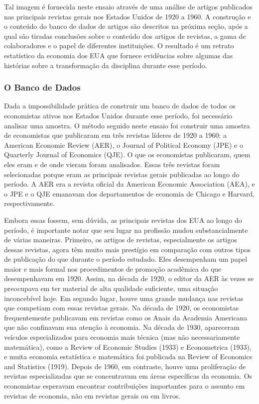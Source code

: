 \documentclass[12pt]{article}
\begin{document}
Tal imagem é fornecida neste ensaio através de uma análise de artigos publicados nas principais revistas gerais nos Estados Unidos de 1920 a 1960. A construção e o conteúdo do banco de dados de artigos são descritos na próxima seção, após a qual são tiradas conclusões sobre o conteúdo dos artigos de revistas, a gama de colaboradores e o papel de diferentes instituições. O resultado é um retrato estatístico da economia dos EUA que fornece evidências sobre algumas das histórias sobre a transformação da disciplina durante esse período.

\subsubsection{\textbf{O Banco de Dados}}
Dada a impossibilidade prática de construir um banco de dados de todos os economistas ativos nos Estados Unidos durante esse período, foi necessário analisar uma amostra. O método seguido neste ensaio foi construir uma amostra de economistas que publicaram em três revistas líderes de 1920 a 1960: a American Economic Review (AER), o Journal of Political Economy (JPE) e o Quarterly Journal of Economics (QJE). O que os economistas publicaram, quem eles eram e de onde vieram foram analisados. Essas três revistas foram selecionadas porque eram as principais revistas gerais publicadas ao longo do período. A AER era a revista oficial da American Economic Association (AEA), e o JPE e o QJE emanavam dos departamentos de economia de Chicago e Harvard, respectivamente.

Embora essas fossem, sem dúvida, as principais revistas dos EUA ao longo do período, é importante notar que seu lugar na profissão mudou substancialmente de várias maneiras. Primeiro, os artigos de revistas, especialmente os artigos dessas revistas, agora têm muito mais prestígio em comparação com outros tipos de publicação do que durante o período estudado. Eles desempenham um papel maior e mais formal nos procedimentos de promoção acadêmica do que desempenhavam em 1920. Assim, na década de 1920, o editor da AER às vezes se preocupava em ter material de alta qualidade suficiente, uma situação inconcebível hoje. Em segundo lugar, houve uma grande mudança nas revistas que competiam com essas revistas gerais. Na década de 1920, os economistas frequentemente publicavam em revistas como os Anais da Academia Americana que não confinavam sua atenção à economia. Na década de 1930, apareceram veículos especializados para economia mais técnica (mas não necessariamente matemática), como a Review of Economic Studies (1933) e Econometrica (1933), e muita economia estatística e matemática foi publicada na Review of Economics and Statistics (1919). Depois de 1960, em contraste, houve uma proliferação de revistas especializadas que se concentravam em áreas específicas da economia. Os economistas esperavam encontrar contribuições importantes para o assunto em revistas de economia, não em revistas gerais ou em livros.
\end{document}
